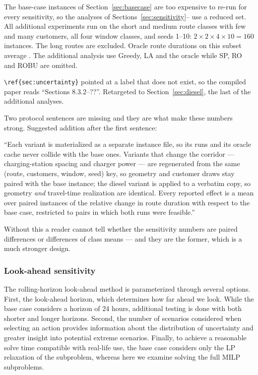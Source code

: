 The base-case instances of Section~\ref{sec:basecase} are too expensive to re-run for every sensitivity, so the analyses of Sections~\ref{sec:sensitivity}--\FIX{\ref{sec:diesel}} use a reduced set. All additional experiments run on the short and medium route classes with few and many customers, all four window classes, and seeds 1--10: $2 \times 2 \times 4 \times 10 = 160$ instances. The long routes are excluded. Oracle route durations on this subset average .
The additional analysis use Greedy, LA and the oracle while SP, RO and ROBU are omitted.

\begin{afix}
\verb|\ref{sec:uncertainty}| pointed at a label that does not exist, so the
compiled paper reads ``Sections 8.3.2--??''. Retargeted to
Section~\ref{sec:diesel}, the last of the additional analyses.
\end{afix}

\begin{anew}
Two protocol sentences are missing and they are what make these numbers strong.
Suggested addition after the first sentence:

\medskip
``Each variant is materialized as a separate instance file, so its runs and its
oracle cache never collide with the base ones. Variants that change the corridor
--- charging-station spacing and charger power --- are regenerated from the same
(route, customers, window, seed) key, so geometry and customer draws stay paired
with the base instance; the diesel variant is applied to a verbatim copy, so
geometry \emph{and} travel-time realization are identical. Every reported effect
is a mean over paired instances of the relative change in route duration with
respect to the base case, restricted to pairs in which both runs were feasible.''

\medskip
Without this a reader cannot tell whether the sensitivity numbers are paired
differences or differences of class means --- and they are the former, which is a
much stronger design.
\end{anew}

\subsubsection{Look-ahead sensitivity} \label{sec:la-config}
The rolling-horizon look-ahead method is parameterized through several options. First, the look-ahead horizon, which determines how far ahead we look. While the base case considers a horizon of 24 hours, additional testing is done with both shorter and longer horizons. Second, the number of scenarios considered when selecting an action provides information about the distribution of uncertainty and greater insight into potential extreme scenarios. Finally, to achieve a reasonable solve time compatible with real-life use, the base case considers only the LP relaxation of the subproblem, whereas here we examine solving the full MILP subproblems.

